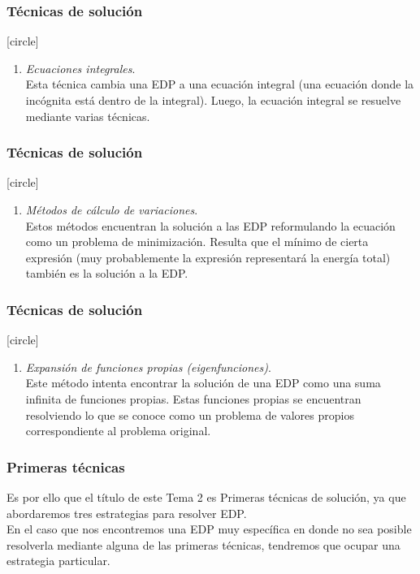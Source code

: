 \documentclass[12pt]{beamer}
\begin{document}
\begin{frame}
\frametitle{Técnicas de solución}
[circle]
\begin{enumerate}
\conti
\item \emph{Ecuaciones integrales}.
\\
\bigskip
Esta técnica cambia una EDP a una ecuación integral (una ecuación donde la incógnita está dentro de la integral). Luego, la ecuación integral se resuelve mediante varias técnicas.
\seti
\end{enumerate}
\end{frame}
\begin{frame}
\frametitle{Técnicas de solución}
[circle]
\begin{enumerate}
\conti
\item \emph{Métodos de cálculo de variaciones}.
\\
\bigskip
Estos métodos encuentran la solución a las EDP reformulando la ecuación como un problema de minimización. Resulta que el mínimo de cierta expresión (muy probablemente la expresión representará la energía total) también es la solución a la EDP.
\seti
\end{enumerate}
\end{frame}
\begin{frame}
\frametitle{Técnicas de solución}
[circle]
\begin{enumerate}
\conti
\item \emph{Expansión de funciones propias (eigenfunciones)}.
\\
\bigskip
Este método intenta encontrar la solución de una EDP como una suma infinita de funciones propias. Estas funciones propias se encuentran resolviendo lo que se conoce como un problema de valores propios correspondiente al problema original.
\end{enumerate}
\end{frame}
\begin{frame}
\frametitle{Primeras técnicas}
Es por ello que el título de este Tema 2 es Primeras técnicas de solución, ya que abordaremos tres estrategias para resolver EDP.
\\
\bigskip
\pause
En el caso que nos encontremos una EDP muy específica en donde no sea posible resolverla mediante alguna de las primeras técnicas, tendremos que ocupar una estrategia particular.
\end{frame}
\end{document}

